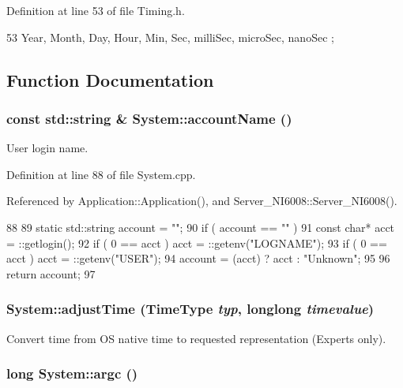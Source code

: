 Definition at line 53 of file Timing.h.


\begin{DoxyCode}
53 { Year, Month, Day, Hour, Min, Sec, milliSec, microSec, nanoSec };
\end{DoxyCode}


\subsection{Function Documentation}
\hypertarget{namespaceSystem_a8a4ea73b74e0f6b8225e571e21ba4e2f}{
\subsubsection[{accountName}]{\setlength{\rightskip}{0pt plus 5cm}const std::string \& System::accountName ()}}
\label{namespaceSystem_a8a4ea73b74e0f6b8225e571e21ba4e2f}


User login name. 

Definition at line 88 of file System.cpp.

Referenced by Application::Application(), and Server\_\-NI6008::Server\_\-NI6008().


\begin{DoxyCode}
88                                      {
89   static std::string account = "";
90   if ( account == "" ) {
91     const char* acct = ::getlogin();
92     if ( 0 == acct ) acct = ::getenv("LOGNAME");
93     if ( 0 == acct ) acct = ::getenv("USER");
94     account = (acct) ? acct : "Unknown";
95   }
96   return account;
97 }
\end{DoxyCode}
\hypertarget{namespaceSystem_a1013a898a3fc9cf6844b8af2c99f2396}{
\subsubsection[{adjustTime}]{ System::adjustTime (TimeType {\em typ}, \/  {\bf longlong} {\em timevalue})}}
\label{namespaceSystem_a1013a898a3fc9cf6844b8af2c99f2396}


Convert time from OS native time to requested representation (Experts only). \hypertarget{namespaceSystem_aacf2e08c0661f343a44dc174a6931bc6}{
\subsubsection[{argc}]{\setlength{\rightskip}{0pt plus 5cm}long System::argc ()}}
\label{namespaceSystem_aacf2e08c0661f343a44dc174a6931bc6}


